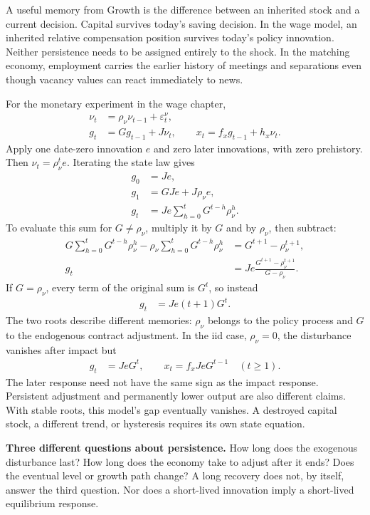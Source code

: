 A useful memory from Growth is the difference between an inherited stock and
a current decision. Capital survives today's saving decision. In the wage
model, an inherited relative compensation position survives today's policy
innovation. Neither persistence needs to be assigned entirely to the shock.
In the matching economy, employment carries the earlier history of meetings
and separations even though vacancy values can react immediately to news.

For the monetary experiment in the wage chapter,
\begin{align}
 \nu_t&=\rho_\nu\nu_{t-1}+\varepsilon_t^\nu,\\
 g_t&=Gg_{t-1}+J\nu_t,\qquad
 x_t=f_xg_{t-1}+h_x\nu_t.
\end{align}
Apply one date-zero innovation $e$ and zero later innovations, with zero
prehistory. Then $\nu_t=\rho_\nu^te$. Iterating the state law gives
\begin{align}
 g_0&=Je,\\
 g_1&=GJe+J\rho_\nu e,\\
 g_t&=Je\sum_{h=0}^tG^{t-h}\rho_\nu^h.
\end{align}
To evaluate this sum for $G\ne\rho_\nu$, multiply it by $G$ and by
$\rho_\nu$, then subtract:
\begin{align}
 G\sum_{h=0}^tG^{t-h}\rho_\nu^h
 -\rho_\nu\sum_{h=0}^tG^{t-h}\rho_\nu^h
 &=G^{t+1}-\rho_\nu^{t+1},\\
 g_t&=Je\frac{G^{t+1}-\rho_\nu^{t+1}}{G-\rho_\nu}.
\end{align}
If $G=\rho_\nu$, every term of the original sum is $G^t$, so instead
\begin{align}
 g_t&=Je(t+1)G^t.
\end{align}
The two roots describe different memories: $\rho_\nu$ belongs to the policy
process and $G$ to the endogenous contract adjustment. In the iid case,
$\rho_\nu=0$, the disturbance vanishes after impact but
\begin{align}
 g_t&=JeG^t,\qquad
 x_t=f_xJeG^{t-1}\quad(t\geq1).
\end{align}
The later response need not have the same sign as the impact response.
Persistent adjustment and permanently lower output are also different claims.
With stable roots, this model's gap eventually vanishes. A destroyed capital
stock, a different trend, or hysteresis requires its own state equation.

\begin{blueblock}
\textbf{Three different questions about persistence.}
How long does the exogenous disturbance last? How long does the economy take
to adjust after it ends? Does the eventual level or growth path change?
A long recovery does not, by itself, answer the third question. Nor does a
short-lived innovation imply a short-lived equilibrium response.
\end{blueblock}

